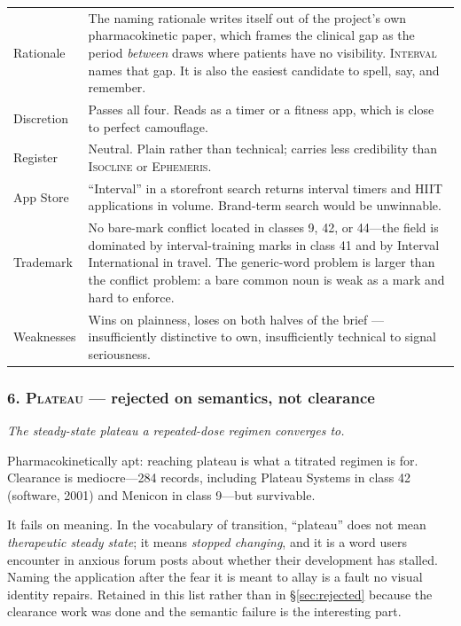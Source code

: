 \documentclass[11pt,a4paper]{article}
\newcommand{\bad}[1]{\obs{#1}}
\newcommand{\good}[1]{#1}
\newcommand{\mixed}[1]{\textcolor{mid}{#1}}
\newcommand{\name}[1]{\textsc{#1}}
\begin{document}
\begin{longtable}{@{}L{3.0cm}L{12.1cm}@{}}
\toprule
\endhead
Rationale & The naming rationale writes itself out of the project's own
pharmacokinetic paper, which frames the clinical gap as the period
\emph{between} draws where patients have no visibility. \name{Interval}
names that gap. It is also the easiest candidate to spell, say, and
remember. \\[0.35em]
Discretion & \good{Passes all four.} Reads as a timer or a fitness app,
which is close to perfect camouflage. \\[0.35em]
Register & \mixed{Neutral.} Plain rather than technical; carries less
credibility than \name{Isocline} or \name{Ephemeris}. \\[0.35em]
App Store & \bad{Poor.} ``Interval'' in a storefront search returns
interval timers and HIIT applications in volume. Brand-term search
would be unwinnable. \\[0.35em]
Trademark & \mixed{No bare-mark conflict located in classes 9, 42, or
44}---the field is dominated by interval-training marks in class 41 and
by Interval International in travel. The generic-word problem is
larger than the conflict problem: a bare common noun is weak as a mark
and hard to enforce. \\[0.35em]
Weaknesses & Wins on plainness, loses on both halves of the brief ---
insufficiently distinctive to own, insufficiently technical to signal
seriousness. \\
\bottomrule
\end{longtable}

\subsubsection*{6. \name{Plateau} --- rejected on semantics, not clearance}

\emph{The steady-state plateau a repeated-dose regimen converges to.}

Pharmacokinetically apt: reaching plateau is what a titrated regimen is
for. Clearance is mediocre---284 records, including Plateau Systems in
class 42 (software, 2001) and Menicon in class 9---but survivable.

It fails on meaning. In the vocabulary of transition, ``plateau'' does
not mean \emph{therapeutic steady state}; it means \emph{stopped
changing}, and it is a word users encounter in anxious forum posts
about whether their development has stalled. Naming the application
after the fear it is meant to allay is a fault no visual identity
repairs. Retained in this list rather than in \S\ref{sec:rejected}
because the clearance work was done and the semantic failure is the
interesting part.
\end{document}
